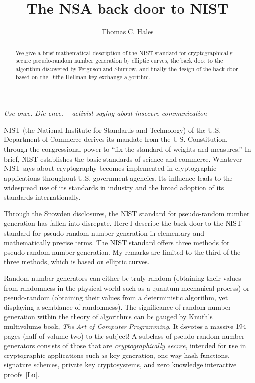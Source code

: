 \documentclass[11pt]{amsart} %
\begin{document}
\title{The NSA back door to NIST}
\author{Thomas C. Hales} 
\maketitle

\begin{abstract}  
We give a brief mathematical description of the NIST standard for cryptographically secure pseudo-random
number generation by elliptic curves, the back door to the algorithm discovered by Ferguson and Shumow, 
and finally the design of the back door based on the Diffie-Hellman key exchange algorithm.

\end{abstract}

\smallskip
\centerline{\it Use once. Die once. 
-- activist saying about insecure communication}
\smallskip

NIST (the National Institute for Standards and Technology) of the 
U.S. Department of Commerce derives its mandate from the U.S. Constitution,
through the congressional power  to ``fix the standard of weights and measures.''
In brief,  NIST establishes the basic standards of science and commerce.  
Whatever NIST says about cryptography becomes implemented in
cryptographic applications throughout U.S. government agencies.  Its influence
leads to the widespread use
of its standards in industry and the broad adoption of its standards internationally.

Through the Snowden disclosures, the NIST standard for pseudo-random number generation has fallen
 into disrepute.  Here I describe the back door to the NIST standard for pseudo-random number
generation in elementary and 
mathematically precise terms.  The NIST standard offers three methods
for pseudo-random number generation.  
My remarks are limited to the third of the three methods, which is based on
elliptic curves.  

Random number generators can either be truly random (obtaining their values from randomness in the physical world such
as a quantum mechanical process) or pseudo-random (obtaining their values from a deterministic algorithm, yet displaying a semblance
of randomness). The significance of random number generation within the theory of algorithms can be gauged by Knuth's
multivolume book, {\it The Art of Computer Programming}. It devotes a massive 194 pages (half of volume two) to the subject!
A subclass of pseudo-random number generators consists of those that are {\it cryptographically secure}, intended for use in cryptographic
applications such as key generation, one-way hash functions, signature schemes, private key cryptosystems, and zero knowledge interactive proofs~[Lu].
\end{document}
